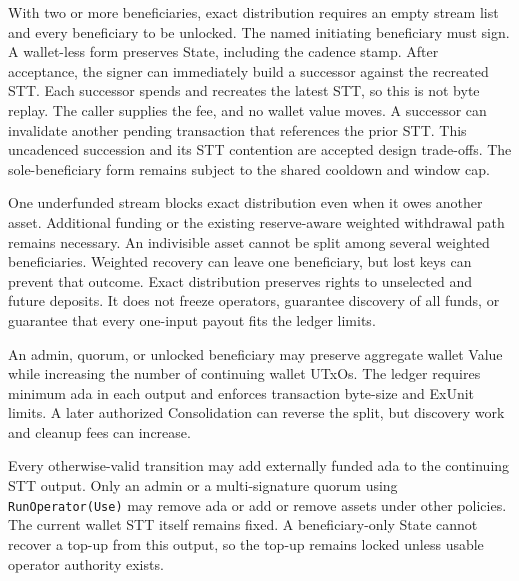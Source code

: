 \begin{description}[leftmargin=1.4em,style=nextline]
\item[Uncadenced exact-distribution succession.] With two or more beneficiaries, exact distribution requires an empty stream list and every beneficiary to be unlocked. The named initiating beneficiary must sign. A wallet-less form preserves State, including the cadence stamp. After acceptance, the signer can immediately build a successor against the recreated STT. Each successor spends and recreates the latest STT, so this is not byte replay. The caller supplies the fee, and no wallet value moves. A successor can invalidate another pending transaction that references the prior STT. This uncadenced succession and its STT contention are accepted design trade-offs. The sole-beneficiary form remains subject to the shared cooldown and window cap.
\item[Exact distribution requires settled streams and divisible assets.] One underfunded stream blocks exact distribution even when it owes another asset. Additional funding or the existing reserve-aware weighted withdrawal path remains necessary. An indivisible asset cannot be split among several weighted beneficiaries. Weighted recovery can leave one beneficiary, but lost keys can prevent that outcome. Exact distribution preserves rights to unselected and future deposits. It does not freeze operators, guarantee discovery of all funds, or guarantee that every one-input payout fits the ledger limits.
\item[Authorized Consolidation controls wallet layout.] An admin, quorum, or unlocked beneficiary may preserve aggregate wallet Value while increasing the number of continuing wallet UTxOs. The ledger requires minimum ada in each output and enforces transaction byte-size and ExUnit limits. A later authorized Consolidation can reverse the split, but discovery work and cleanup fees can increase.
\item[Value held at the STT output.] Every otherwise-valid transition may add externally funded ada to the continuing STT output. Only an admin or a multi-signature quorum using \texttt{RunOperator(Use)} may remove ada or add or remove assets under other policies. The current wallet STT itself remains fixed. A beneficiary-only State cannot recover a top-up from this output, so the top-up remains locked unless usable operator authority exists.

\end{description}
